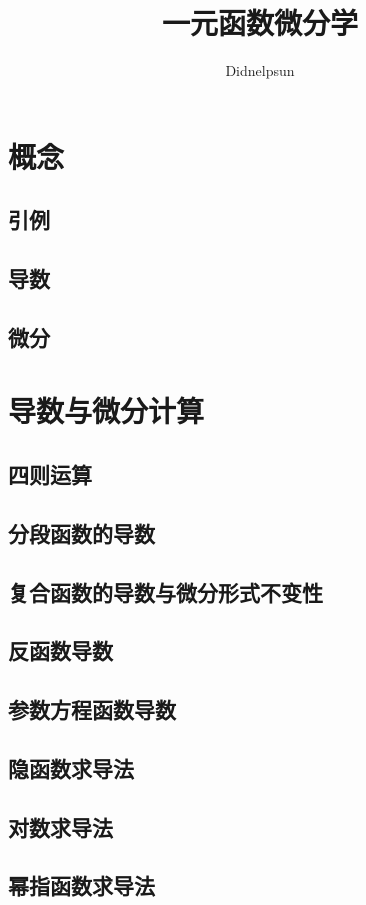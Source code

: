 \documentclass[UTF8]{ctexart}
\author{Didnelpsun}
\title{一元函数微分学}
\begin{document}
\maketitle
\thispagestyle{empty}
\tableofcontents
\thispagestyle{empty}
\newpage
\pagestyle{plain}
\setcounter{page}{1}
\section{概念}
\subsection{引例}
\subsection{导数}
\subsection{微分}
\section{导数与微分计算}
\subsection{四则运算}
\subsection{分段函数的导数}
\subsection{复合函数的导数与微分形式不变性}
\subsection{反函数导数}
\subsection{参数方程函数导数}
\subsection{隐函数求导法}
\subsection{对数求导法}
\subsection{幂指函数求导法}
\end{document}
